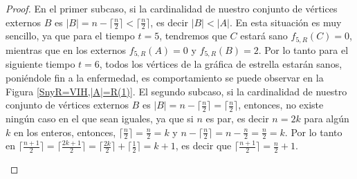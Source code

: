 \documentclass[12pt,titlepage,twoside,openright]{book}
\begin{document}
\begin{proof}
    En el primer subcaso, si la cardinalidad de nuestro conjunto de v\'ertices externos $B$ es $|B|= n-\lceil \frac{n}{2} \rceil < \lceil \frac{n}{2} \rceil$, es decir $|B|<|A|$. En esta situaci\'on es muy sencillo, ya que para el tiempo $t=5$, tendremos que $C$ estar\'a sano $f_{5,R}(C)=0$, mientras que en los externos $f_{5,R}(A)=0$ y $f_{5,R}(B)=2$. Por lo tanto para el siguiente tiempo $t=6$, todos los v\'ertices de la gr\'afica de estrella estar\'an sanos, poni\'endole fin a la enfermedad, es comportamiento se puede observar en la Figura \ref{SnyR=VIH,|A|=R(1)}. El segundo subcaso, si  la cardinalidad de nuestro conjunto de v\'ertices externos $B$ es $|B|= n-\lceil \frac{n}{2} \rceil = \lceil \frac{n}{2} \rceil$, entonces, no existe ning\'un caso en el que sean iguales, ya que si $n$ es par, es decir $n=2k$ para alg\'un $k$ en los enteros, entonces, $\lceil \frac{n}{2} \rceil = \frac{n}{2} = k$ y $n - \lceil \frac{n}{2} \rceil = n - \frac{n}{2} = \frac{n}{2} = k$. Por lo tanto en $\lceil \frac{n+1}{2} \rceil = \lceil \frac{2k+1}{2} \rceil = \lceil \frac{2k}{2} \rceil + \lceil \frac{1}{2} \rceil = k+1$, es decir que $\lceil \frac{n+1}{2} \rceil = \frac{n}{2} + 1$.

    \begin{figure}[h]
    \centering
    \begin{subfigure}[h]{1\linewidth}
\end{subfigure}
\end{figure}
\end{proof}
\end{document}

